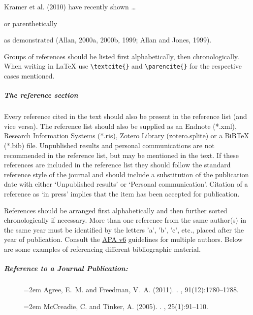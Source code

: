 \vspace{0.5ex}
Kramer et al. (2010) have recently shown \ldots{}

\vspace{0.5ex}
\noindent{}or parenthetically

\vspace{0.5ex}
as demonstrated (Allan, 2000a, 2000b, 1999; Allan and Jones, 1999).

\noindent{}Groups of references should be listed first alphabetically, then chronologically. When writing in \LaTeX{} use \verb|\textcite{}| and \verb|\parencite{}| for the respective cases mentioned.

\subparagraph{The reference section}

Every reference cited in the text should also be present in the reference list (and vice versa). The reference list should also be supplied as an Endnote (*.xml), Research Information Systems (*.ris), Zotero Library (zotero.splite) or a BiB\TeX{} (*.bib) file. Unpublished results and personal communications are not recommended in the reference list, but may be mentioned in the text. If these references are included in the reference list they should follow the standard reference style of the journal and should include a substitution of the publication date with either `Unpublished results' or `Personal communication'. Citation of a reference as `in press' implies that the item has been accepted for publication.

References should be arranged first alphabetically and then further sorted chronologically if necessary. More than one reference from the same author(s) in the same year must be identified by the letters 'a', 'b', 'c', etc., placed after the year of publication. Consult the \href{http://www.apastyle.org/}{APA v6} guidelines for multiple authors. Below are some examples of referencing different bibliographic material.

\subparagraph{Reference to a Journal Publication:}
\begin{description}
\item[] \hangindent=2em Agree, E.~M. and Freedman, V.~A. (2011). . , 91(12):1780--1788.
\item[] \hangindent=2em McCreadie, C. and Tinker, A. (2005). . , 25(1):91--110.
\end{description}

